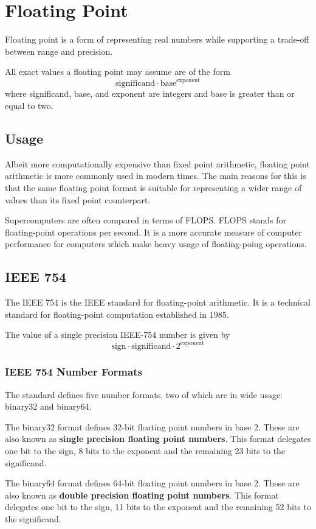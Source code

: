 \documentclass[12pt, oneside]{book}
\begin{document}
\section{Floating Point}
Floating point is a form of representing real numbers while supporting a
trade-off between range and precision.

All exact values a floating point may assume are of the form
\[\text{significand} \cdot \text{base}^\text{exponent}\]
where significand, base, and exponent are integers and base is greater than or
equal to two.

\subsection{Usage}
Albeit more computationally expensive than fixed point arithmetic, floating
point arithmetic is more commonly used in modern times. The main reasons for
this is that the same floating point format is suitable for representing a wider
range of values than its fixed point counterpart.

Supercomputers are often compared in terms of FLOPS. FLOPS stands for
floating-point operations per second. It is a more accurate measure of computer
performance for computers which make heavy usage of floating-poing
operations.

\subsection{IEEE 754}
The IEEE 754 is the IEEE standard for floating-point arithmetic. It is a
technical standard for floating-point computation established in 1985.

The value of a single precision IEEE-754 number is given by
\[\text{sign} \cdot \text{significand} \cdot 2^\text{exponent}\]

\subsubsection{IEEE 754 Number Formats}
The standard defines five number formats, two of which are in wide usage:
binary32 and binary64.

The binary32 format defines 32-bit floating point numbers in base 2. These are
also known as \textbf{single precision floating point numbers}. This format
delegates one bit to the sign, 8 bits to the exponent and the remaining 23 bits
to the significand.

The binary64 format defines 64-bit floating point numbers in base 2. These are
also known as \textbf{double precision floating point numbers}. This format
delegates one bit to the sign, 11 bits to the exponent and the remaining 52 bits
to the significand.
\end{document}
